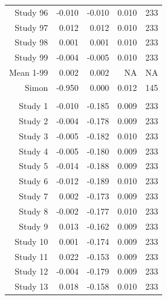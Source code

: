 \begin{table}[!h]
{\begin{tabular}[t]{rrrrr}
\hspace{1em}Study 96 & -0.010 & -0.010 & 0.010 & 233\\
\hspace{1em}Study 97 & 0.012 & 0.012 & 0.010 & 233\\
\hspace{1em}Study 98 & 0.001 & 0.001 & 0.010 & 233\\
\hspace{1em}Study 99 & -0.004 & -0.005 & 0.010 & 233\\
\hspace{1em}Mean 1-99 & 0.002 & 0.002 & NA & NA\\
\hspace{1em}Simon & -0.950 & 0.000 & 0.012 & 145\\
\addlinespace[0.3em]
\multicolumn{5}{l}{\boldsymbol{$\theta=0.3$}}\\
\hspace{1em}Study 1 & -0.010 & -0.185 & 0.009 & 233\\
\hspace{1em}Study 2 & -0.004 & -0.178 & 0.009 & 233\\
\hspace{1em}Study 3 & -0.005 & -0.182 & 0.010 & 233\\
\hspace{1em}Study 4 & -0.005 & -0.180 & 0.009 & 233\\
\hspace{1em}Study 5 & -0.014 & -0.188 & 0.009 & 233\\
\hspace{1em}Study 6 & -0.012 & -0.189 & 0.010 & 233\\
\hspace{1em}Study 7 & 0.002 & -0.173 & 0.009 & 233\\
\hspace{1em}Study 8 & -0.002 & -0.177 & 0.010 & 233\\
\hspace{1em}Study 9 & 0.013 & -0.162 & 0.009 & 233\\
\hspace{1em}Study 10 & 0.001 & -0.174 & 0.009 & 233\\
\hspace{1em}Study 11 & 0.022 & -0.153 & 0.009 & 233\\
\hspace{1em}Study 12 & -0.004 & -0.179 & 0.009 & 233\\
\hspace{1em}Study 13 & 0.018 & -0.158 & 0.010 & 233\\

\end{tabular}}
\end{table}
